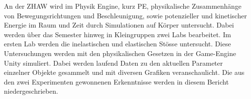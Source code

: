 \documentclass[../main.tex]{subfiles}
\begin{document}
An der ZHAW wird im Physik Engine, kurz PE, physikalische Zusammenhänge
von Bewegungsrichtungen und Beschleunigung, sowie potenzieller und kinetischer Energie im Raum und Zeit
durch Simulationen auf Körper untersucht. Dabei werden über das Semester hinweg in Kleingruppen
zwei Labs bearbeitet.
\newline
\newline
Im ersten Lab werden die inelastischen und elastischen Stösse untersucht.
\newline
\newline
Diese Untersuchungen werden mit den physikalischen Gesetzen in der Game-Engine Unity simuliert.
Dabei werden laufend Daten zu den aktuellen Parameter einzelner Objekte gesammelt und mit diversen
Grafiken veranschaulicht. Die aus den zwei Experimenten gewonnenen Erkenntnisse werden in diesem Bericht
niedergeschrieben.
\newline
\newline
\end{document}
